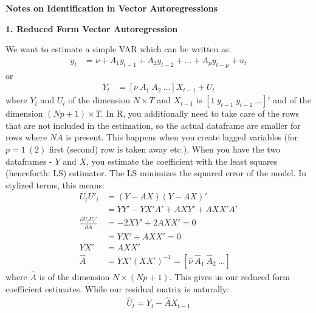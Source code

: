 \documentclass[a4paper, 12pt]{article}
\begin{document}
\begin{center}
\large\bfseries{Notes on Identification in Vector Autoregressions} 
\end{center}
\begin{center}
\textbf{1. Reduced Form Vector Autoregression}
\end{center}

\noindent We want to estimate a simple VAR which can be written as:
\begin{equation}
\begin{aligned}
y_{t} &=\nu+A_1 y_{t-1}+A_2 y_{t-2}+...+A_p y_{t-p}+u_t \nonumber
\end{aligned}
\end{equation}
or 
\begin{equation}
\begin{aligned}
Y_t &=[\nu \ A_1 \ A_2 \ ...]X_{t-1}+U_t \nonumber
\end{aligned}
\end{equation}
where $Y_t$ and $U_t$ of the dimension $N\times T$ and $X_{t-1}$ is $[1 \ y_{t-1} \ y_{t-2} \ ...]'$ and of the dimension $(Np+1)\times T$. In R, you additionally need to take care of the rows that are not included in the estimation, so the actual dataframe are smaller for rows where $NA$ is present. 
This happens when you create lagged variables (for $p=1 \ (2)$ first (second) row is taken away etc.). When you have the two dataframes - $Y$ and $X$, you estimate the coefficient with the least squares (henceforth: LS) estimator.  
The LS minimizes the squared error of the model. In stylized terms, this means:
\begin{equation}
\begin{aligned}
U_tU'_t&=(Y-AX)(Y-AX)' \nonumber \\
&= YY'-YX'A'+AXY' + AXX'A' \nonumber \\
\frac{\partial U_tU_t'}{ \partial A} &= -2XY'+2AXX'=0\\
&=YX'+AXX'=0 \\
YX'&=AXX' \\
\hat{A}&=YX'(XX')^{-1}=[\hat{\nu} \ \hat{A}_1 \ \hat{A}_2 \ ...]
\end{aligned}
\end{equation}
where $\hat{A}$ is of the dimension $N\times(Np+1)$. This gives us our reduced form coefficient estimates. While our residual matrix is naturally:
\begin{equation}
\begin{aligned}
\hat{U}_t=Y_t-\hat{A}X_{t-1} \nonumber
\end{aligned}
\end{equation}
\end{document}

